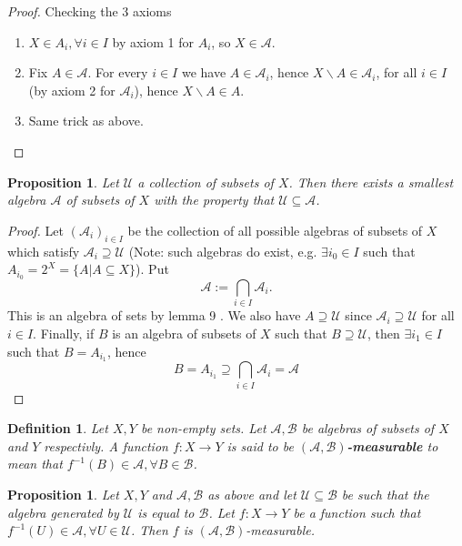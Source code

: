 \documentclass[letterpaper, 12pt]{article}
\newcommand{\cU}{\mathcal{U}}
\newcommand{\cB}{\mathcal{B}}
\newcommand{\sA}{\mathcal{A}}
\theoremstyle{stdthm}
\newtheorem{prop}[thm]{Proposition}
\theoremstyle{stddef}
\newtheorem{defn}[thm]{Definition}
\theoremstyle{stdnonum}
\theoremstyle{stdqands}
\theoremstyle{stdbold}
\begin{document}
\begin{proof} Checking the 3 axioms
\begin{enumerate}
\item $X \in A_i, \forall i \in I$ by axiom 1 for $A_i$, so $X \in \sA$. 
\item Fix $A\in \sA$. For every $i \in I$ we have $A \in \sA_i$, hence $X \backslash A \in \sA_i$, for all $i \in I$ (by axiom 2 for $\sA_i$), hence $X\backslash A \in A$.
\item Same trick as above.
\end{enumerate}
\end{proof}

\begin{prop}
Let $\cU$ a collection of subsets of $X$. Then there exists a smallest algebra $\sA$ of subsets of $X$ with the property that $\cU \subseteq \sA$. 
\end{prop}

\begin{proof}
Let $(\sA_i)_{i\in I}$ be the collection of all possible algebras of subsets of $X$ which satisfy $\sA_i \supseteq \cU$ (Note: such algebras do exist, e.g. $\exists i_0 \in I$ such that $A_{i_0} = 2^X = \{A|A\subseteq X\}$). Put 
\[\sA:= \bigcap_{i\in I} \sA_i.\]
This is an algebra of sets by lemma 9%
. We also have $A\supseteq \cU$ since $\sA_i\supseteq \cU$ for all $i\in I$. Finally, if $B$ is an algebra of subsets of $X$ such that $B\supseteq \cU$, then $\exists i_1 \in I$ such that $B = A_{i_1}$, hence 
\[B = A_{i_1} \supseteq \bigcap_{i\in I}\sA_i = \sA \]
\end{proof}

\newpage

\begin{defn}
Let $X,Y$ be non-empty sets. Let $\sA, \cB$ be algebras of subsets of $X$ and $Y$ respectivly. A function $f:X\rightarrow Y$ is said to be {\bf $(\sA,\cB)$-measurable} to mean that $f^{-1}(B) \in \sA, \forall B\in \cB$. 
\end{defn}

\begin{prop}
Let $X,Y$ and $\sA,\cB$ as above and let $\cU\subseteq \cB$ be such that the algebra generated by  $\cU$ is equal to $\cB$. Let $f:X \rightarrow Y$ be a function such that $f^{-1}(U)\in \sA, \forall U\in \cU$. Then $f$ is $(\sA,\cB)$-measurable.  
\end{prop}
\end{document}
